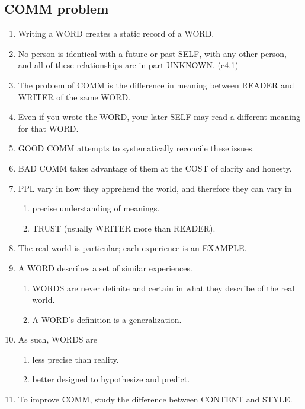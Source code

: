 \documentclass[
]{book}
\providecommand{\tightlist}{%
  \setlength{\itemsep}{0pt}\setlength{\parskip}{0pt}}
\begin{document}
\hypertarget{comm-problem}{%
\subsection{COMM problem}\label{comm-problem}}

\begin{enumerate}
\def\labelenumi{\arabic{enumi}.}
\setcounter{enumi}{6}
\tightlist
\item
  Writing a WORD creates a static record of a WORD.
\item
  No person is identical with a future or past SELF, with any other
  person, and all of these relationships are in part UNKNOWN. (\protect\hyperlink{ppl}{c4.1})
\item
  The problem of COMM is the difference in meaning between READER
  and WRITER of the same WORD.
\item
  Even if you wrote the WORD, your later SELF may read a different
  meaning for that WORD.
\item
  GOOD COMM attempts to systematically reconcile these issues.
\item
  BAD COMM takes advantage of them at the COST of clarity and
  honesty.
\item
  PPL vary in how they apprehend the world, and therefore they can vary in

  \begin{enumerate}
  \def\labelenumii{\arabic{enumii}.}
  \tightlist
  \item
    precise understanding of meanings.
  \item
    TRUST (usually WRITER more than READER).
  \end{enumerate}
\item
  The real world is particular; each experience is an EXAMPLE.
\item
  A WORD describes a set of similar experiences.

  \begin{enumerate}
  \def\labelenumii{\arabic{enumii}.}
  \tightlist
  \item
    WORDS are never definite and certain in what they describe of the real world.
  \item
    A WORD's definition is a generalization.
  \end{enumerate}
\item
  As such, WORDS are

  \begin{enumerate}
  \def\labelenumii{\arabic{enumii}.}
  \tightlist
  \item
    less precise than reality.
  \item
    better designed to hypothesize and predict.
  \end{enumerate}
\item
  To improve COMM, study the difference between CONTENT and STYLE.
\end{enumerate}
\end{document}
